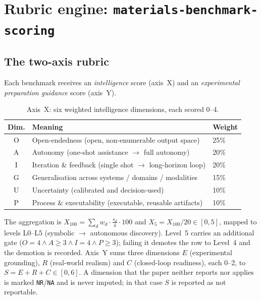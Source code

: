 \documentclass[11pt,a4paper]{article}
\begin{document}
\section{Rubric engine: \texttt{materials-benchmark-scoring}}

\subsection{The two-axis rubric}
Each benchmark receives an \emph{intelligence} score (axis~X) and an
\emph{experimental preparation guidance} score (axis~Y).

\begin{table}[htbp]
\centering\small
\caption{Axis~X: six weighted intelligence dimensions, each scored 0--4.}
\begin{tabular}{@{}cll@{}}
\toprule
Dim. & Meaning & Weight \\
\midrule
O & Open-endedness (open, non-enumerable output space) & 25\% \\
A & Autonomy (one-shot assistance $\rightarrow$ full autonomy) & 20\% \\
I & Iteration \& feedback (single shot $\rightarrow$ long-horizon loop) & 20\% \\
G & Generalisation across systems / domains / modalities & 15\% \\
U & Uncertainty (calibrated and decision-used) & 10\% \\
P & Process \& executability (executable, reusable artifacts) & 10\% \\
\bottomrule
\end{tabular}
\end{table}

The aggregation is
$X_{100} = \sum_d w_d \cdot \frac{s_d}{4} \cdot 100$ and
$X_5 = X_{100}/20 \in [0,5]$, mapped to levels L0--L5
(symbolic $\rightarrow$ autonomous discovery). Level~5 carries an additional
gate ($O=4 \wedge A\geq 3 \wedge I=4 \wedge P\geq 3$); failing it demotes the
row to Level~4 and the demotion is recorded.
Axis~Y sums three dimensions $E$ (experimental grounding), $R$ (real-world
realism) and $C$ (closed-loop readiness), each 0--2, to
$S = E+R+C \in [0,6]$. A dimension that the paper neither reports nor applies
is marked \texttt{NR}/\texttt{NA} and is never imputed; in that case $S$ is
reported as not reportable.
\end{document}
